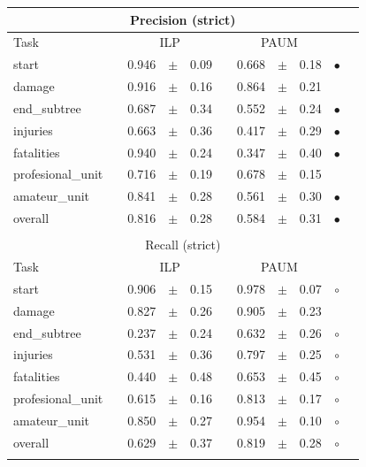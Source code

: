 
\begin{table}
\centering 
\begin{tabular}
{lcrclcrcl@{\hspace{0.1cm}}cc}

\multicolumn{11}{c}{Precision (strict)}\\
\hline
Task && \multicolumn{3}{c}{ILP}  && \multicolumn{3}{c}{PAUM} && \\
\hline
start             && 0.946 & $\pm$ & 0.09 && 0.668 & $\pm$ & 0.18 & $\bullet$\\
damage            && 0.916 & $\pm$ & 0.16 && 0.864 & $\pm$ & 0.21 &          \\
end\_subtree      && 0.687 & $\pm$ & 0.34 && 0.552 & $\pm$ & 0.24 & $\bullet$\\
injuries          && 0.663 & $\pm$ & 0.36 && 0.417 & $\pm$ & 0.29 & $\bullet$\\
fatalities        && 0.940 & $\pm$ & 0.24 && 0.347 & $\pm$ & 0.40 & $\bullet$\\
profesional\_unit && 0.716 & $\pm$ & 0.19 && 0.678 & $\pm$ & 0.15 &          \\
amateur\_unit     && 0.841 & $\pm$ & 0.28 && 0.561 & $\pm$ & 0.30 & $\bullet$\\
\hline
overall           && 0.816 & $\pm$ & 0.28 && 0.584 & $\pm$ & 0.31 & $\bullet$\\
\hline
\\


\multicolumn{11}{c}{Recall (strict)}\\
\hline
Task && \multicolumn{3}{c}{ILP}  && \multicolumn{3}{c}{PAUM} && \\
\hline
start             && 0.906 & $\pm$ & 0.15 && 0.978 & $\pm$ & 0.07 & $\circ$\\
damage            && 0.827 & $\pm$ & 0.26 && 0.905 & $\pm$ & 0.23 &        \\
end\_subtree      && 0.237 & $\pm$ & 0.24 && 0.632 & $\pm$ & 0.26 & $\circ$\\
injuries          && 0.531 & $\pm$ & 0.36 && 0.797 & $\pm$ & 0.25 & $\circ$\\
fatalities        && 0.440 & $\pm$ & 0.48 && 0.653 & $\pm$ & 0.45 & $\circ$\\
profesional\_unit && 0.615 & $\pm$ & 0.16 && 0.813 & $\pm$ & 0.17 & $\circ$\\
amateur\_unit     && 0.850 & $\pm$ & 0.27 && 0.954 & $\pm$ & 0.10 & $\circ$\\
\hline
overall           && 0.629 & $\pm$ & 0.37 && 0.819 & $\pm$ & 0.28 & $\circ$\\
\hline
\\


\end{tabular}
\end{table}
